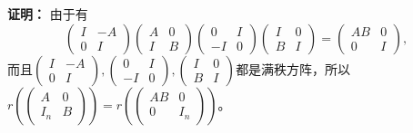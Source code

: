 {\bf 证明：} 由于有
$$\begin{pmatrix} I & -A \\ 0 & I \end{pmatrix} \begin{pmatrix} A & 0 \\ I & B \end{pmatrix} \begin{pmatrix} 0 & I \\ -I & 0 \end{pmatrix} \begin{pmatrix} I & 0 \\ B & I \end{pmatrix} = \begin{pmatrix} AB & 0 \\ 0 & I \end{pmatrix},$$
而且$\begin{pmatrix} I & -A \\ 0 & I \end{pmatrix}, \begin{pmatrix} 0 & I \\ -I & 0 \end{pmatrix}, \begin{pmatrix} I & 0 \\ B & I \end{pmatrix}$都是满秩方阵，所以$r(\begin{pmatrix} A & 0 \\ I_n & B \end{pmatrix}) = r(\begin{pmatrix} AB & 0 \\ 0 & I_n \end{pmatrix})$。

